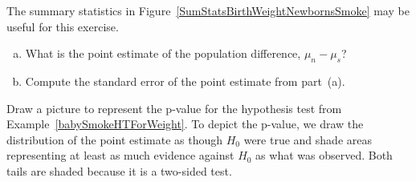 \begin{exercisewrap}
\begin{nexercise}
The summary statistics in
Figure~\ref{SumStatsBirthWeightNewbornsSmoke} may be useful
for this exercise.
\begin{enumerate}[(a)]
\setlength{\itemsep}{0mm}
\item
    What is the point estimate of the population difference,
    $\mu_{n} - \mu_{s}$?
\item
    Compute the standard error of the point estimate from
    part~(a).\footnotemark{}
\end{enumerate}
\end{nexercise}
\end{exercisewrap}

\begin{examplewrap}
\begin{nexample}{Draw a picture to represent the p-value for
    the hypothesis test from Example~\ref{babySmokeHTForWeight}.}
  \label{pValueForEstOfDiffMeanBirthWeight}%
  To depict the p-value, we draw the distribution of the point
  estimate as though $H_0$ were true and shade areas representing
  at least as much evidence against $H_0$ as what was observed.
  Both tails are shaded because it is a two-sided test.
  \begin{center}
  \end{center}
\end{nexample}
\end{examplewrap}

